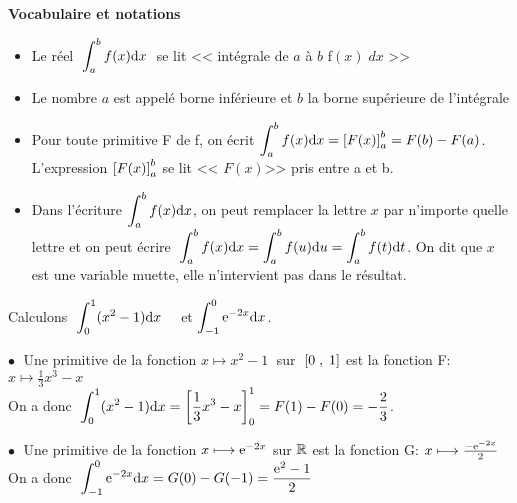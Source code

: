  \textbf{Vocabulaire  et notations}
 \begin{itemize}
 \item Le réel  $\; \displaystyle\int_{a}^{b}f(x){\rm d}x\;  $ \; se lit  <<  intégrale  de $a$  à $b$  \;f$(x)\; dx$  >>
 \item Le nombre $a$ est appelé borne inférieure et $b$ la borne supérieure de l'intégrale
\item Pour toute primitive F de f, on écrit \;   $ \displaystyle\int_{a}^{b}f(x){\rm d}x=\left[ F(x) \right]^{b}_{a} =F(b)-F(a) $.\\
L'expression \;$ \left[ F(x) \right]^{b}_{a} $\; se lit <<  $ F(x) $>>  pris entre a et b.
\item  Dans l'écriture  $ \displaystyle\int_{a}^{b}f(x){\rm d}x $, on peut remplacer la lettre $ x $ par n'importe quelle    lettre  et on peut écrire   $ \;\displaystyle\int_{a}^{b}f(x){\rm d}x  =  \displaystyle\int_{a}^{b}f(u){\rm d}u =  \displaystyle\int_{a}^{b}f(t){\rm d}t $.\; On dit que $ x $ est une variable muette,  elle n'intervient pas dans le résultat.
  \end{itemize}
  
  \medskip
  \begin{example}
  
Calculons $\;  \displaystyle\int_{0}^{1}(x^{2}-1){\rm d}x \quad$   et  \quad$\displaystyle\int_{-1}^{0}\mathrm{e}^{-2x}{\rm d}x  $.
 
  \bigskip
$ \bullet \; $   Une primitive de la fonction  $ x\longmapsto x^{2}-1 \; $  sur $\;  \left[0\;,\; 1\right] $ est la fonction  F: $ x\longmapsto \frac{1}{3}x^{3}-x $\\ On a donc  $\;  \displaystyle\int_{0}^{1}(x^{2}-1){\rm d}x= \left[ \frac{1}{3}x^{3}- x \right]^{1}_{0}=F(1)-F(0) =-\frac{2}{3}$.

\medskip

$ \bullet \; $   Une primitive de la fonction  $ x\longmapsto \mathrm{e}^{-2x}$  sur $ \mathbb{R} $ est la fonction  G: $ x\longmapsto  \frac{-\mathrm{e}^{-2x}}{2} $\\


On a donc  $\;  \displaystyle\int_{-1}^{0}\mathrm{e}^{-2x}{\rm d}x=G(0)-G(-1)= \frac{\mathrm{e}^{2} -1}{2}$
\end{example}
 

